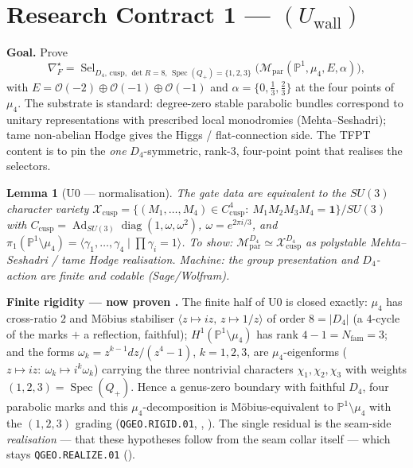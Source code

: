 \documentclass[11pt,a4paper]{article}
\newcommand{\Nfam}{N_{\mathrm{fam}}}
\newcommand{\PP}{\mathbb P^1}
\newtheorem{lemma}{Lemma}
\begin{document}
\section*{Research Contract 1 --- $(U_{\mathrm{wall}})$}
\noindent\textbf{Goal.} Prove
\[
  \nabla_F^\star=\operatorname{Sel}_{D_4,\,\mathrm{cusp},\,\det R=8,\,\operatorname{Spec}(Q_+)=\{1,2,3\}}
  \bigl(\mathcal M_{\mathrm{par}}(\PP,\mu_4,E,\alpha)\bigr),
\]
with $E=\mathcal O(-2)\oplus\mathcal O(-1)\oplus\mathcal O(-1)$ and $\alpha=\{0,\tfrac13,\tfrac23\}$ at the
four points of $\mu_4$. The substrate is standard: degree-zero stable parabolic bundles correspond to
unitary representations with prescribed local monodromies (Mehta--Seshadri); tame non-abelian Hodge gives
the Higgs / flat-connection side. The TFPT content is to pin the \emph{one} $D_4$-symmetric, rank-3,
four-point point that realises the selectors.

\begin{lemma}[U0 --- normalisation]
The gate data are equivalent to the $SU(3)$ character variety
$\mathcal X_{\mathrm{cusp}}=\{(M_1,\dots,M_4)\in C_{\mathrm{cusp}}^4:\ M_1M_2M_3M_4=\mathbf1\}/SU(3)$ with
$C_{\mathrm{cusp}}=\operatorname{Ad}_{SU(3)}\operatorname{diag}(1,\omega,\omega^2)$, $\omega=e^{2\pi i/3}$,
and $\pi_1(\PP\setminus\mu_4)=\langle\gamma_1,\dots,\gamma_4\mid\prod\gamma_i=1\rangle$. To show:
$\mathcal M_{\mathrm{par}}^{D_4}\simeq\mathcal X_{\mathrm{cusp}}^{D_4}$ as polystable Mehta--Seshadri / tame
Hodge realisation. \emph{Machine: the group presentation and $D_4$-action are finite and codable
(Sage/Wolfram).}
\end{lemma}

\noindent\textbf{Finite rigidity --- now proven \mE.} The finite half of U0 is closed exactly:
$\mu_4$ has cross-ratio $2$ and M\"obius stabiliser $\langle z\mapsto iz,\,z\mapsto1/z\rangle$ of
order $8=|D_4|$ (a $4$-cycle of the marks $+$ a reflection, faithful); $H^1(\PP\setminus\mu_4)$ has
rank $4-1=\Nfam=3$; and the forms $\omega_k=z^{k-1}dz/(z^4-1)$, $k=1,2,3$, are $\mu_4$-eigenforms
($z\mapsto iz:\ \omega_k\mapsto i^k\omega_k$) carrying the three nontrivial characters
$\chi_1,\chi_2,\chi_3$ with weights $(1,2,3)=\operatorname{Spec}(Q_+)$. Hence a genus-zero boundary
with faithful $D_4$, four parabolic marks and this $\mu_4$-decomposition is M\"obius-equivalent to
$\PP\setminus\mu_4$ with the $(1,2,3)$ grading (\texttt{QGEO.RIGID.01}, \mE,
). The single residual is the seam-side \emph{realisation} --- that
these hypotheses follow from the seam collar itself --- which stays \texttt{QGEO.REALIZE.01} (\mC).
\end{document}
